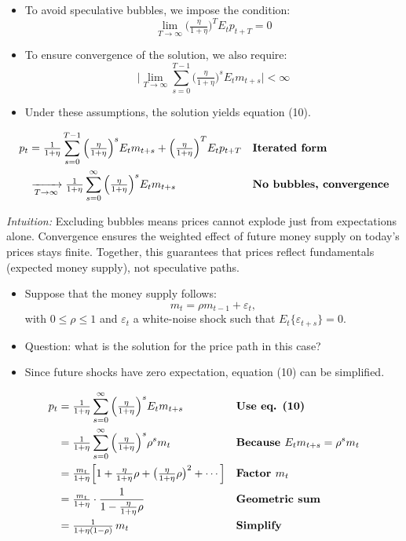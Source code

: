 \documentclass[12pt]{article}
\begin{document}
\begin{itemize}
    \item To avoid speculative bubbles, we impose the condition:
    \[
        \lim_{T \to \infty} \Big(\tfrac{\eta}{1+\eta}\Big)^T E_t p_{t+T} = 0
    \]
    \item To ensure convergence of the solution, we also require:
    \[
        \Bigg|\lim_{T \to \infty} \sum_{s=0}^{T-1} 
        \Big(\tfrac{\eta}{1+\eta}\Big)^s E_t m_{t+s}\Bigg| < \infty
    \]
    \item Under these assumptions, the solution yields equation (10).
\end{itemize}

\singlespacing
\begin{align}
p_t &= \tfrac{1}{1+\eta}\sum_{s=0}^{T-1}\Big(\tfrac{\eta}{1+\eta}\Big)^s E_t m_{t+s} 
      + \Big(\tfrac{\eta}{1+\eta}\Big)^T E_t p_{t+T} 
      && \text{\textbf{Iterated form}} \\
    &\xrightarrow[T\to\infty]{} \tfrac{1}{1+\eta}\sum_{s=0}^\infty
      \Big(\tfrac{\eta}{1+\eta}\Big)^s E_t m_{t+s} 
      && \text{\textbf{No bubbles, convergence}}
\end{align}

\textit{Intuition:}  
Excluding bubbles means prices cannot explode just from expectations alone.  
Convergence ensures the weighted effect of future money supply on today’s prices stays finite.  
Together, this guarantees that prices reflect fundamentals (expected money supply), not speculative paths.


\begin{itemize}
    \item Suppose that the money supply follows:
    \[
        m_t = \rho m_{t-1} + \varepsilon_t,
    \]
    with \(0 \leq \rho \leq 1\) and \(\varepsilon_t\) a white-noise shock such that \(E_t\{\varepsilon_{t+s}\} = 0\).
    \item Question: what is the solution for the price path in this case?
    \item Since future shocks have zero expectation, equation (10) can be simplified.
\end{itemize}

\singlespacing
\begin{align}
p_t &= \tfrac{1}{1+\eta}\sum_{s=0}^\infty 
        \Big(\tfrac{\eta}{1+\eta}\Big)^s E_t m_{t+s} 
        && \text{\textbf{Use eq. (10)}} \\
    &= \tfrac{1}{1+\eta}\sum_{s=0}^\infty 
        \Big(\tfrac{\eta}{1+\eta}\Big)^s \rho^s m_t 
        && \text{\textbf{Because $E_t m_{t+s}=\rho^s m_t$}} \\
    &= \tfrac{m_t}{1+\eta}\Big[1+\tfrac{\eta}{1+\eta}\rho+\big(\tfrac{\eta}{1+\eta}\rho\big)^2+\cdots\Big]
        && \text{\textbf{Factor $m_t$}} \\
    &= \tfrac{m_t}{1+\eta}\cdot \frac{1}{1-\frac{\eta}{1+\eta}\rho} 
        && \text{\textbf{Geometric sum}} \\
    &= \tfrac{1}{1+\eta(1-\rho)}\,m_t 
        && \text{\textbf{Simplify}}
\end{align}
\end{document}
